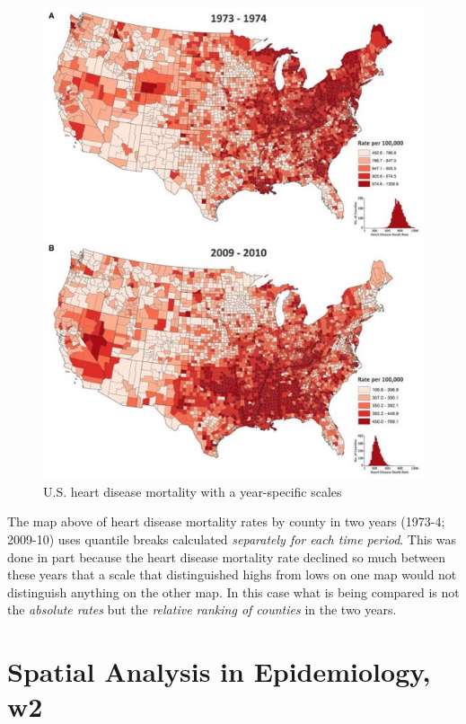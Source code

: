\documentclass[
]{book}
\begin{document}
\begin{figure}
\centering
\includegraphics{images/time-series-us-quantiles.jpg}
\caption{\label{fig:unnamed-chunk-35}U.S. heart disease mortality with a year-specific scales}
\end{figure}

The map above of heart disease mortality rates by county in two years (1973-4; 2009-10) uses quantile breaks calculated \emph{separately for each time period}. This was done in part because the heart disease mortality rate declined so much between these years that a scale that distinguished highs from lows on one map would not distinguish anything on the other map. In this case what is being compared is not the \emph{absolute rates} but the \emph{relative ranking of counties} in the two years.

\hypertarget{spatial-analysis-in-epidemiology-w2}{%
\section{Spatial Analysis in Epidemiology, w2}\label{spatial-analysis-in-epidemiology-w2}}
\end{document}
